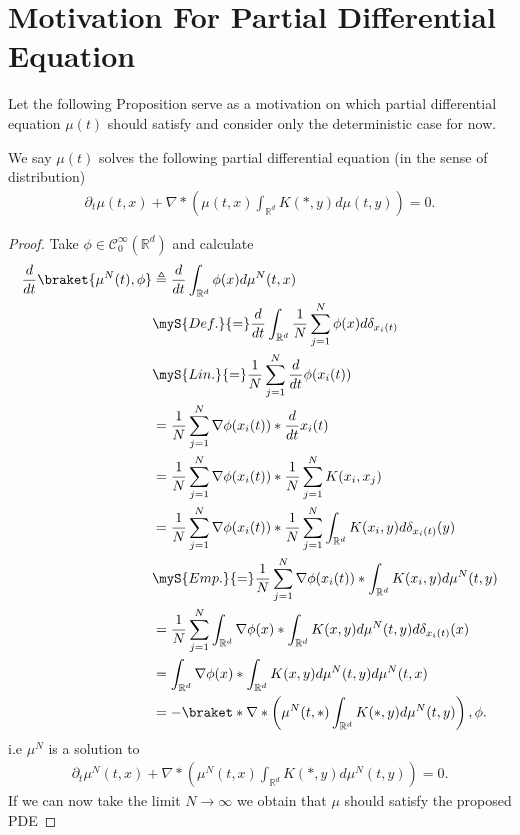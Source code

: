 \section{Motivation For Partial Differential Equation}
Let the following Proposition serve as a motivation on which partial differential equation $\mu(t)$ should satisfy
and consider only the deterministic case for now.
\begin{prop}
  We say $\mu(t)$ solves the following partial differential equation (in the sense of distribution)
\begin{align*}
  \partial_t \mu(t,x) + \nabla * \left( \mu(t,x) \int_{\mathbb{R}^{d} } K(*,y) d\mu(t,y) \right)  = 0
.\end{align*}  
\end{prop}
\begin{proof}
  Take $\phi  \in  \mathcal{C}_0^{\infty}(\mathbb{R}^{d} ) $ and calculate
\begin{align*}
  \frac{d}{dt} \braket{\mu^N(t),\phi } &\triangleq \frac{d}{dt} \int_{\mathbb{R}^{d} } \phi(x) d\mu^N(t,x)  \\
                                       &\myS{Def.}{=} \frac{d}{dt} \int_{\mathbb{R}^{d} } \frac{1}{N} \sum_{j=1}^{N} \phi(x)d\delta_{x_{i}(t)}\\
                                       &\myS{Lin.}{=} \frac{1}{N} \sum_{j=1}^{N}  \frac{d}{dt} \phi (x_i(t))\\
                                       &= \frac{1}{N} \sum_{j=1}^{N} \nabla \phi(x_i(t)) *\frac{d}{dt} x_i(t)\\
                                       &= \frac{1}{N} \sum_{j=1}^{N} \nabla \phi(x_i(t)) *\frac{1}{N}\sum_{j=1}^{N} K(x_{i},x_{j}) \\
                                       &= \frac{1}{N} \sum_{j=1}^{N} \nabla \phi(x_i(t)) *\frac{1}{N}\sum_{j=1}^{N} \int_{\mathbb{R}^{d}} K(x_{i},y) d \delta_{x_i(t)}(y) \\ 
                                       &\myS{Emp.}{=}  \frac{1}{N} \sum_{j=1}^{N} \nabla \phi(x_i(t)) * \int_{\mathbb{R}^{d}} K(x_{i},y) d\mu^{N}(t,y) \\ 
                                       &= \frac{1}{N} \sum_{j=1}^{N} \int_{\mathbb{R}^{d} } \nabla \phi(x) * \int_{\mathbb{R}^{d} } K(x,y) d\mu^N(t,y) d\delta_{x_i(t)}(x)\\
                                       &= \int_{\mathbb{R}^{d} } \nabla \phi (x) * \int_{\mathbb{R}^{d} } K(x,y) d\mu^N(t,y)d\mu^N(t,x)\\
                                       &= -\braket*{\nabla*\left(\mu^N(t,*)\int_{\mathbb{R}^{d}}K(*,y) d\mu^N(t,y) \right),\phi }
.\end{align*}  
i.e $\mu^N$ is a solution to 
\begin{align*}
  \partial_t \mu^N(t,x) + \nabla * \left( \mu^N(t,x) \int_{\mathbb{R}^{d} } K(*,y) d\mu^N(t,y) \right)  = 0
.\end{align*}  
If we can now take the limit $N\to \infty$ we obtain that $\mu $ should satisfy the proposed PDE
\end{proof}
